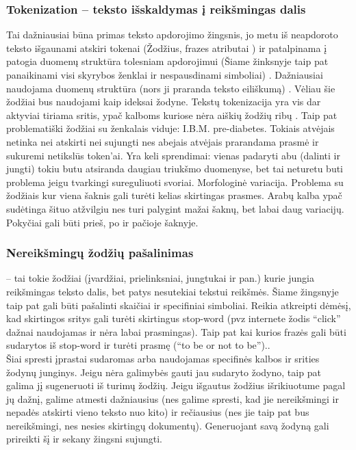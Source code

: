 \documentclass{VUMIFInfKursinis}
\begin{document}
\subsubsection{Tokenization – teksto išskaldymas į reikšmingas dalis}
Tai dažniausiai būna primas teksto apdorojimo žingsnis, jo metu iš neapdoroto teksto išgaunami atskiri tokenai (Žodžius, frazes atributai ) ir patalpinama į patogia duomenų struktūra tolesniam apdorojimui (Šiame žinksnyje taip pat panaikinami visi skyrybos ženklai ir nespausdinami simboliai) . Dažniausiai naudojama  duomenų struktūra (nors ji praranda teksto eiliškumą) . Vėliau šie žodžiai bus naudojami kaip ideksai žodyne.
Tekstų tokenizacija yra vis dar aktyviai tiriama sritis, ypač kalboms kuriose nėra aiškių žodžių ribų . Taip pat problematiški žodžiai su ženkalais viduje: I.B.M.\; pre-diabetes. Tokiais atvėjais netinka nei atskirti nei sujungti nes abejais atvėjais prarandama prasmė ir sukuremi netikslūs token’ai. Yra keli sprendimai: vienas padaryti abu (dalinti ir jungti) tokiu butu atsiranda daugiau triukšmo duomenyse, bet tai neturetu buti problema jeigu tvarkingi sureguliuoti svoriai. 
Morfologinė variacija. Problema su žodžiais kur viena šaknis gali turėti kelias skirtingas prasmes. Arabų kalba ypač sudėtinga šituo atžvilgiu nes turi palygint mažai šaknų, bet labai daug variacijų. Pokyčiai gali būti prieš, po ir pačioje šaknyje.

\subsubsection{Nereikšmingų žodžių pašalinimas}
 – tai tokie žodžiai (įvardžiai, prielinksniai, jungtukai ir pan.) kurie jungia reikšmingas teksto dalis, bet patys nesutekiai tekstui reikšmės. Šiame žingsnyje taip pat gali būti pašalinti skaičiai ir specifiniai simboliai. Reikia atkreipti dėmėsį, kad skirtingos sritys gali turėti skirtingus stop-word (pvz internete žodis “click” dažnai naudojamas ir nėra labai prasmingas). Taip pat kai kurios frazės gali būti sudarytos iš stop-word ir turėti prasmę (“to be or not to be”)..\\
Šiai spresti įprastai sudaromas arba naudojamas specifinės kalbos ir srities žodynų junginys. Jeigu nėra galimybės gauti jau sudaryto žodyno, taip pat galima jį sugeneruoti iš turimų žodžių. Jeigu išgautus žodžius išrikiuotume pagal jų dažnį, galime atmesti dažniausius (nes galime spresti, kad jie nereikšmingi ir nepadės atskirti vieno teksto nuo kito) ir rečiausius (nes jie taip pat bus nereikšmingi, nes nesies skirtingų dokumentų). Generuojant savą žodyną gali prireikti šį ir sekany žingsni sujungti. 
\end{document}
